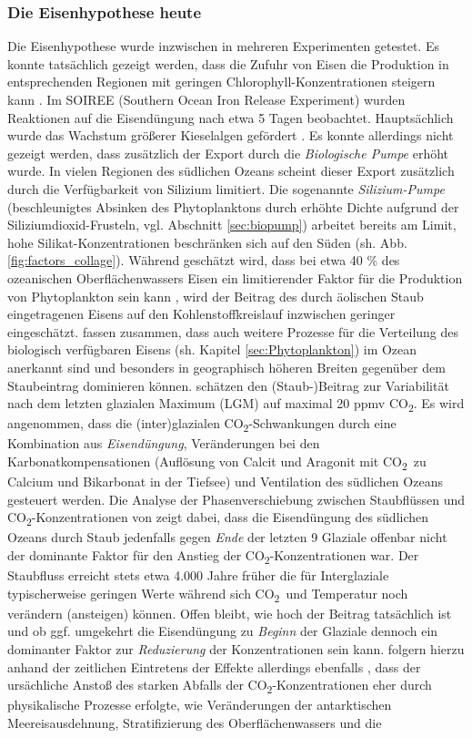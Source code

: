 \documentclass[12pt,a4paper,onecolumn,headheight=30pt]{scrartcl}
\newcommand{\cotwo}{CO\textsubscript{2}}
\begin{document}
\subsubsection{Die Eisenhypothese heute}
Die Eisenhypothese wurde inzwischen in mehreren Experimenten getestet. Es konnte tatsächlich gezeigt werden, dass die Zufuhr von Eisen die Produktion in entsprechenden Regionen mit geringen Chlorophyll-Konzentrationen steigern kann \citep{Boyd.2007}. Im SOIREE (Southern Ocean Iron Release Experiment) wurden Reaktionen auf die Eisendüngung nach etwa 5 Tagen beobachtet. Hauptsächlich wurde das Wachstum größerer Kieselalgen gefördert \citep{Trull.2001}. Es konnte allerdings nicht gezeigt werden, dass zusätzlich der Export durch die \textit{Biologische Pumpe} erhöht wurde. In vielen Regionen des südlichen Ozeans scheint dieser Export zusätzlich durch die Verfügbarkeit von Silizium limitiert. Die sogenannte \textit{Silizium-Pumpe} (beschleunigtes Absinken des Phytoplanktons durch erhöhte Dichte aufgrund der Siliziumdioxid-Frusteln, vgl. Abschnitt \ref{sec:biopump}) arbeitet bereits am Limit, hohe Silikat-Konzentrationen beschränken sich auf den Süden (sh. Abb. \ref{fig:factors_collage}). Während geschätzt wird, dass bei etwa 40 \% des ozeanischen Oberflächenwassers Eisen ein limitierender Faktor für die Produktion von Phytoplankton sein kann \citep{Emerson.2009}, wird der Beitrag des durch äolischen Staub eingetragenen Eisens auf den Kohlenstoffkreislauf inzwischen geringer eingeschätzt. \citet{Tagliabue.2017} fassen zusammen, dass auch weitere Prozesse für die Verteilung des biologisch verfügbaren Eisens (sh. Kapitel \ref{sec:Phytoplankton}) im Ozean anerkannt sind und besonders in geographisch höheren Breiten gegenüber dem Staubeintrag dominieren können. \citet{Vallelonga.2013} schätzen den (Staub-)Beitrag zur Variabilität nach dem letzten glazialen Maximum (LGM) auf maximal 20 ppmv \cotwo . Es wird angenommen, dass die (inter)glazialen \cotwo -Schwankungen durch eine Kombination aus \textit{Eisendüngung}, Veränderungen bei den Karbonatkompensationen (Auflösung von Calcit und Aragonit mit  \cotwo \ zu Calcium und Bikarbonat in der Tiefsee) und Ventilation des südlichen Ozeans \citep{Lambert.2012} gesteuert werden. Die Analyse der Phasenverschiebung zwischen Staubflüssen und \cotwo -Konzentrationen von \citet{Lambert.2012} zeigt dabei, dass die Eisendüngung des südlichen Ozeans durch Staub jedenfalls gegen \textit{Ende} der letzten 9 Glaziale offenbar nicht der dominante Faktor für den Anstieg der \cotwo -Konzentrationen war. Der Staubfluss erreicht stets etwa 4.000 Jahre früher die für Interglaziale typischerweise  geringen Werte während sich \cotwo \ und Temperatur noch verändern (ansteigen) können. Offen bleibt, wie hoch der Beitrag tatsächlich ist und ob ggf. umgekehrt die Eisendüngung zu \textit{Beginn} der Glaziale dennoch ein dominanter Faktor zur \textit{Reduzierung} der Konzentrationen sein kann. \citet{MartinezGarcia.2009} folgern hierzu anhand der zeitlichen Eintretens der Effekte allerdings ebenfalls , dass der ursächliche Anstoß des starken Abfalls der \cotwo -Konzentrationen eher durch physikalische Prozesse erfolgte, wie Veränderungen der antarktischen Meereisausdehnung, Stratifizierung des Oberflächenwassers und die 
\end{document}
